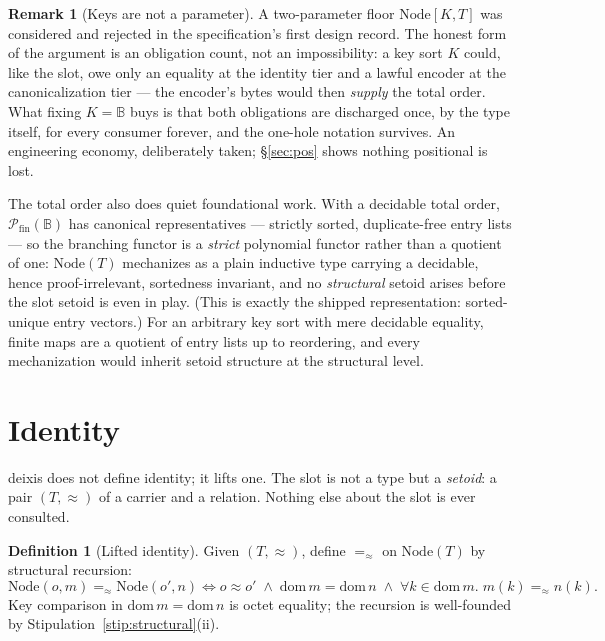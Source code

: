 \documentclass[11pt]{article}
\theoremstyle{definition}
\newtheorem{definition}[theorem]{Definition}
\newtheorem{remark}[theorem]{Remark}
\newcommand{\Bytes}{\mathbb{B}}                    %
\newcommand{\NodeT}[1]{\mathrm{Node}(#1)}
\newcommand{\dom}{\mathrm{dom}\,}
\newcommand{\eqS}{=_{\approx}}                     %
\begin{document}
\begin{remark}[Keys are not a parameter]\label{rem:keys}
A two-parameter floor $\mathrm{Node}[K, T]$ was considered and rejected in the
specification's first design record. The honest form of the argument is an obligation
count, not an impossibility: a key sort $K$ could, like the slot, owe only an equality
at the identity tier and a lawful encoder at the canonicalization tier --- the
encoder's bytes would then \emph{supply} the total order. What fixing $K = \Bytes$
buys is that both obligations are discharged once, by the type itself, for every
consumer forever, and the one-hole notation survives. An engineering economy,
deliberately taken; \S\ref{sec:pos} shows nothing positional is lost.

The total order also does quiet foundational work. With a decidable total order,
$\mathcal{P}_{\mathrm{fin}}(\Bytes)$ has canonical representatives --- strictly
sorted, duplicate-free entry lists --- so the branching functor is a \emph{strict}
polynomial functor rather than a quotient of one: $\NodeT{T}$ mechanizes as a plain
inductive type carrying a decidable, hence proof-irrelevant, sortedness invariant,
and no \emph{structural} setoid arises before the slot setoid is even in play. (This
is exactly the shipped representation: sorted-unique entry vectors.) For an
arbitrary key sort with mere decidable equality, finite maps are a quotient of entry
lists up to reordering, and every mechanization would inherit setoid structure at
the structural level.
\end{remark}

\section{Identity}\label{sec:identity}

deixis does not define identity; it lifts one. The slot is not a type but a
\emph{setoid}: a pair $(T, \approx)$ of a carrier and a relation. Nothing else about
the slot is ever consulted.

\begin{definition}[Lifted identity]\label{def:lift}
Given $(T, \approx)$, define $\eqS$ on $\NodeT{T}$ by structural recursion:
\[
\mathrm{Node}(o, m) \eqS \mathrm{Node}(o', n) \iff
  o \approx o' \;\wedge\; \dom m = \dom n \;\wedge\; \forall k \in \dom m.\;
  m(k) \eqS n(k).
\]
Key comparison in $\dom m = \dom n$ is octet equality; the recursion is well-founded
by Stipulation~\ref{stip:structural}(ii).
\end{definition}
\end{document}

